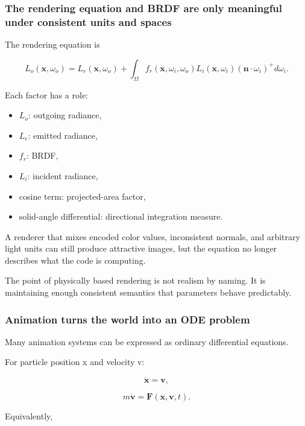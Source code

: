 \subsubsection{The rendering equation and BRDF are only meaningful under consistent units and spaces}\label{03-visual-computing-i-ch001-the-rendering-equation-and-brdf-are-only-meaningful-under-consistent-units-and-spaces}

The rendering equation is

\[
L_o(\mathbf x,\omega_o)
=
L_e(\mathbf x,\omega_o)
+
\int_{\Omega}
f_r(\mathbf x,\omega_i,\omega_o)
L_i(\mathbf x,\omega_i)
(\mathbf n\cdot\omega_i)^+
d\omega_i.
\]

Each factor has a role:

\begin{itemize}
\tightlist
\item
  \(L_o\): outgoing radiance,
\item
  \(L_e\): emitted radiance,
\item
  \(f_r\): BRDF,
\item
  \(L_i\): incident radiance,
\item
  cosine term: projected-area factor,
\item
  solid-angle differential: directional integration measure.
\end{itemize}

A renderer that mixes encoded color values, inconsistent normals, and arbitrary light units can still produce attractive images, but the equation no longer describes what the code is computing.

The point of physically based rendering is not realism by naming. It is maintaining enough consistent semantics that parameters behave predictably.

\subsubsection{Animation turns the world into an ODE problem}\label{03-visual-computing-i-ch001-animation-turns-the-world-into-an-ode-problem}

Many animation systems can be expressed as ordinary differential equations.

For particle position x and velocity v:

\[
\dot{\mathbf x}=\mathbf v,
\]

\[
m\dot{\mathbf v}=\mathbf F(\mathbf x,\mathbf v,t).
\]

Equivalently,

